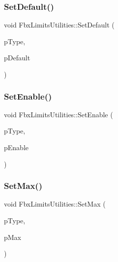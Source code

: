\subsubsection{\texorpdfstring{Set\+Default()}{SetDefault()}}
{\footnotesize\ttfamily void Fbx\+Limits\+Utilities\+::\+Set\+Default (\begin{DoxyParamCaption}\item[{\hyperlink{class_fbx_limits_utilities_aa55167751039b3d64b56cb7e58f2e62c}{E\+Type}}]{p\+Type,  }\item[{\hyperlink{class_fbx_vector4}{Fbx\+Vector4}}]{p\+Default }\end{DoxyParamCaption})}

\mbox{\label{class_fbx_limits_utilities_a304ea11e6242e4212c625843a4ef23f8}} 
\subsubsection{\texorpdfstring{Set\+Enable()}{SetEnable()}}
{\footnotesize\ttfamily void Fbx\+Limits\+Utilities\+::\+Set\+Enable (\begin{DoxyParamCaption}\item[{\hyperlink{class_fbx_limits_utilities_aa55167751039b3d64b56cb7e58f2e62c}{E\+Type}}]{p\+Type,  }\item[{bool}]{p\+Enable }\end{DoxyParamCaption})}

\mbox{\label{class_fbx_limits_utilities_ace31ad7ad7492a26aa4a0d9bc64c369b}} 
\subsubsection{\texorpdfstring{Set\+Max()}{SetMax()}}
{\footnotesize\ttfamily void Fbx\+Limits\+Utilities\+::\+Set\+Max (\begin{DoxyParamCaption}\item[{\hyperlink{class_fbx_limits_utilities_aa55167751039b3d64b56cb7e58f2e62c}{E\+Type}}]{p\+Type,  }\item[{\hyperlink{class_fbx_vector4}{Fbx\+Vector4}}]{p\+Max }\end{DoxyParamCaption})}

